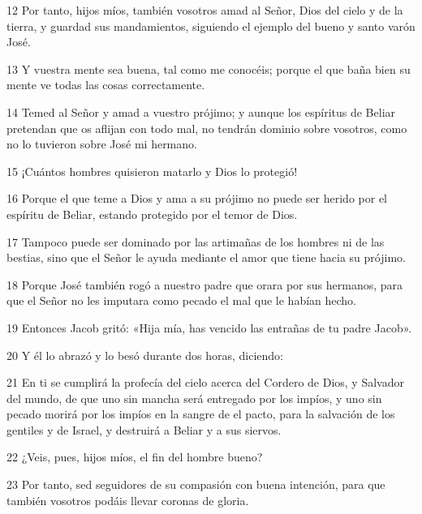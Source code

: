 \par 12 Por tanto, hijos míos, también vosotros amad al Señor, Dios del cielo y de la tierra, y guardad sus mandamientos, siguiendo el ejemplo del bueno y santo varón José.

\par 13 Y vuestra mente sea buena, tal como me conocéis; porque el que baña bien su mente ve todas las cosas correctamente.

\par 14 Temed al Señor y amad a vuestro prójimo; y aunque los espíritus de Beliar pretendan que os aflijan con todo mal, no tendrán dominio sobre vosotros, como no lo tuvieron sobre José mi hermano.

\par 15 ¡Cuántos hombres quisieron matarlo y Dios lo protegió!

\par 16 Porque el que teme a Dios y ama a su prójimo no puede ser herido por el espíritu de Beliar, estando protegido por el temor de Dios.

\par 17 Tampoco puede ser dominado por las artimañas de los hombres ni de las bestias, sino que el Señor le ayuda mediante el amor que tiene hacia su prójimo.

\par 18 Porque José también rogó a nuestro padre que orara por sus hermanos, para que el Señor no les imputara como pecado el mal que le habían hecho.

\par 19 Entonces Jacob gritó: «Hija mía, has vencido las entrañas de tu padre Jacob».

\par 20 Y él lo abrazó y lo besó durante dos horas, diciendo:

\par 21 En ti se cumplirá la profecía del cielo acerca del Cordero de Dios, y Salvador del mundo, de que uno sin mancha será entregado por los impíos, y uno sin pecado morirá por los impíos en la sangre de el pacto, para la salvación de los gentiles y de Israel, y destruirá a Beliar y a sus siervos.

\par 22 ¿Veis, pues, hijos míos, el fin del hombre bueno?

\par 23 Por tanto, sed seguidores de su compasión con buena intención, para que también vosotros podáis llevar coronas de gloria.

